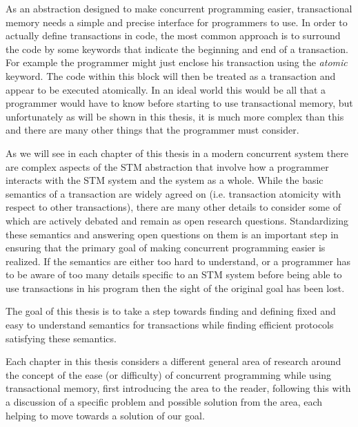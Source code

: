 As an abstraction designed to make concurrent programming easier, transactional memory needs a
simple and precise interface for programmers to use.
In order to actually define transactions in code, the most common
approach is to surround the code by some keywords that indicate the beginning and end of a transaction.
For example the programmer might just enclose his transaction using the \emph{atomic} keyword.
The code within this block will then be treated as a transaction and appear to be executed atomically.
In an ideal world this would be all that a programmer would have to know before starting to use
transactional memory, but unfortunately as will be shown in this thesis, it is much more complex than this
and there are many other things that the programmer must consider.



As we will see in each chapter of this thesis  in a modern concurrent system
there are complex aspects
of the STM abstraction that involve how a programmer interacts with the
STM system and the system as a whole.
While the basic semantics of a transaction are widely agreed on
(i.e. transaction atomicity with respect to other transactions),
there are many other details to consider
some of which are actively debated and remain as open research questions.
Standardizing these semantics and answering open questions on them is an important
step in ensuring that the primary goal of making concurrent programming easier
is realized.
If the semantics are either too hard to understand, or a programmer has to be aware of
too many details specific to an STM system before being able to use transactions in
his program then the sight of the original goal has been lost.


The goal of this thesis is to take a step towards finding and defining fixed and easy to understand semantics
for transactions while finding efficient protocols satisfying these semantics.



Each chapter in this thesis considers a different general area of research around
the concept of the ease (or difficulty) of concurrent programming while using transactional memory, first introducing
the area to the reader, following this with a discussion of a specific problem
and possible solution from the area, each helping to move towards a solution of our goal.







